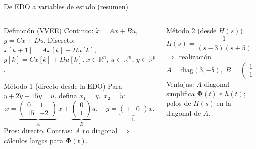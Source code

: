 \documentclass[
    10pt,
    aspectratio=169,
    xcolor={dvipsnames},
    spanish,
    ]{beamer}
\begin{document}
\begin{frame}{De EDO a variables de estado (resumen)}
\begin{columns}
  \begin{column}{0.48\textwidth}
    \begin{block}{Definición (VVEE)}
      \footnotesize
      Continuo: $\dot x=Ax+Bu$, $y=Cx+Du$. Discreto: $x[k+1]=Ax[k]+Bu[k]$, $y[k]=Cx[k]+Du[k]$.
      $x\in\mathbb{R}^n$, $u\in\mathbb{R}^m$, $y\in\mathbb{R}^p$.
    \end{block}
    \begin{block}{Método 1 (directo desde la EDO)}
      \footnotesize
      Para $\ddot y + 2\dot y - 15y = u$, defina $x_1=y,\;x_2=\dot y$:
      \[
      \dot{x}=\underbrace{\begin{pmatrix}0&1\\[2pt]15&-2\end{pmatrix}}_{A}\,x + \underbrace{\begin{pmatrix}0\\ 1\end{pmatrix}}_{B}u,\quad
      y=\underbrace{\begin{pmatrix}1&0\end{pmatrix}}_{C}x.
      \]
      Pros: directo. Contras: $A$ no diagonal \,$\Rightarrow$\, cálculos largos para $\boldsymbol{\Phi}(t)$.
    \end{block}
  \end{column}
  \begin{column}{0.48\textwidth}
    \begin{block}{Método 2 (desde $H(s)$)}
      \footnotesize
      $H(s)=\dfrac{1}{(s-3)(s+5)}=\dfrac{1/8}{s-3}-\dfrac{1/8}{s+5}$ \;$\Rightarrow$\; realización
      \[
      A=\mathrm{diag}(3,-5),\; B=\begin{pmatrix}1\\ 1\end{pmatrix},\; C=\begin{pmatrix}\tfrac{1}{8}&-\tfrac{1}{8}\end{pmatrix}.
      \]
      Ventajas: $A$ diagonal simplifica $\boldsymbol{\Phi}(t)$ e $h(t)$; polos de $H(s)$ en la diagonal de $A$.
    \end{block}
  \end{column}
\end{columns}
\end{frame}
\end{document}
